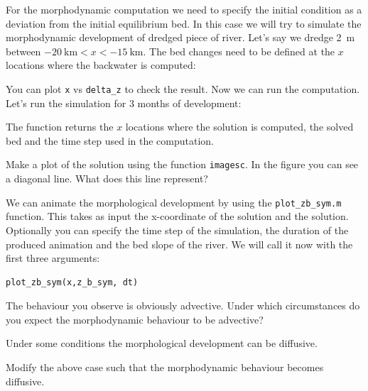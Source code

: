 \documentclass[a4paper]{article}
\begin{document}
For the morphodynamic computation we need to specify the initial condition as a deviation from the initial equilibrium bed. In this case we will try to simulate the morphodynamic development of dredged piece of river.
Let's say we dredge \SI{2}{\m} between $-\SI{20}{\kilo\m}<x<-\SI{15}{\kilo\m}$.
The bed changes need to be defined at the $x$ locations where the backwater is computed:

You can plot \lstinline{x} vs \lstinline{delta_z} to check the result.
Now we can run the computation. Let's run the simulation for 3 months of development:

The function returns the $x$ locations where the solution is computed, the solved bed and the time step used in the computation.
\begin{exercise}
  Make a plot of the solution using the function \lstinline{imagesc}. In the figure you can see a diagonal line. What does this line represent?
\end{exercise}
\begin{solution}
  
\end{solution}
We can animate the morphological development by using the \lstinline{plot_zb_sym.m} function. This takes as input the x-coordinate of the solution and the solution. Optionally you can specify the time step of the simulation, the duration of the produced animation and the bed slope of the river.
We will call it now with the first three arguments:
\begin{lstlisting}
plot_zb_sym(x,z_b_sym, dt) 
\end{lstlisting}
\begin{exercise}
  The behaviour you observe is obviously advective. Under which circumstances do you expect the morphodynamic behaviour to be advective?
\end{exercise}
Under some conditions the morphological development can be diffusive.
\begin{exercise}
  Modify the above case such that the morphodynamic behaviour becomes diffusive.
\end{exercise}

\printsolutions
\end{document}
